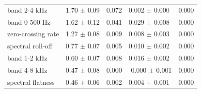 \documentclass[11pt,a4paper]{article}
\begin{document}
\begin{center}
\begin{longtable}{>{\raggedright\arraybackslash}p{4.00cm}>{\raggedleft\arraybackslash}p{2.60cm}>{\raggedleft\arraybackslash}p{2.60cm}>{\raggedleft\arraybackslash}p{2.60cm}>{\raggedleft\arraybackslash}p{2.60cm}}
\hspace{0pt}band 2-4 kHz & \hspace{0pt}1.70 $\pm$ 0.09 & \hspace{0pt}0.072 & \hspace{0pt}0.002 $\pm$ 0.000 & \hspace{0pt}0.000\\
\hspace{0pt}band 0-500 Hz & \hspace{0pt}1.62 $\pm$ 0.12 & \hspace{0pt}0.041 & \hspace{0pt}0.029 $\pm$ 0.008 & \hspace{0pt}0.000\\
\hspace{0pt}zero-crossing rate & \hspace{0pt}1.27 $\pm$ 0.08 & \hspace{0pt}0.009 & \hspace{0pt}0.008 $\pm$ 0.003 & \hspace{0pt}0.000\\
\hspace{0pt}spectral roll-off & \hspace{0pt}0.77 $\pm$ 0.07 & \hspace{0pt}0.005 & \hspace{0pt}0.010 $\pm$ 0.002 & \hspace{0pt}0.000\\
\hspace{0pt}band 1-2 kHz & \hspace{0pt}0.60 $\pm$ 0.07 & \hspace{0pt}0.008 & \hspace{0pt}0.016 $\pm$ 0.002 & \hspace{0pt}0.000\\
\hspace{0pt}band 4-8 kHz & \hspace{0pt}0.47 $\pm$ 0.08 & \hspace{0pt}0.000 & \hspace{0pt}-0.000 $\pm$ 0.001 & \hspace{0pt}0.000\\
\hspace{0pt}spectral flatness & \hspace{0pt}0.46 $\pm$ 0.06 & \hspace{0pt}0.002 & \hspace{0pt}0.004 $\pm$ 0.001 & \hspace{0pt}0.000\\
\end{longtable}\end{center}
\end{document}
